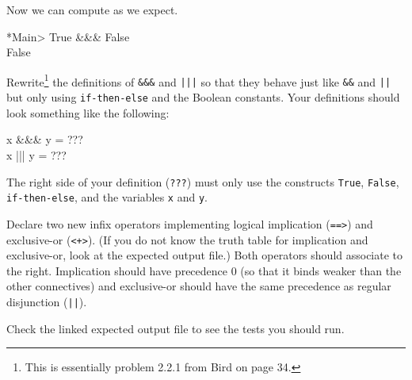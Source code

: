 \documentclass[11pt]{article}
\begin{document}
Now we can compute as we expect.
\begin{program*}
\> *Main> True \&\&\& False \\
\> False
\end{program*}



\begin{problem}
Rewrite\footnote{This is essentially problem 2.2.1 from Bird on page 34.} the definitions of {\tt{\&\&\&}} and {\tt{|||}} so that they behave just
like {\tt{\&\&}} and {\tt{||}} but only using {\tt{if-then-else}} and the
Boolean constants. Your definitions should look something like the following:
\begin{program*}
\> x \&\&\& y = ???  \\
\> x ||| y = ???
\end{program*}
The right side of your definition ({\tt{???}}) must only use the constructs
{\tt{True}}, {\tt{False}}, {\tt{if-then-else}}, and the variables {\tt{x}} and
{\tt{y}}.
\end{problem}

\begin{problem}
Declare two new infix operators implementing logical implication ({\tt{==>}})
and exclusive-or ({\tt{<+>}}). (If you do not know the truth table for
implication and exclusive-or, look at the expected output file.) Both operators
should associate to the right.  Implication should have precedence 0 (so that
it binds weaker than the other connectives) and exclusive-or should have the
same precedence as regular disjunction ({\tt{||}}).
\end{problem}


Check the linked expected output file to see the tests you should run.
\end{document}
